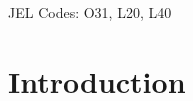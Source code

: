 \documentclass[12pt]{article}
\begin{document}
\begin{abstract}
\end{abstract}
JEL Codes: O31, L20, L40

\newpage

\setcounter{page}{1}

\section{Introduction}
\label{sec:intro}
\end{document}
